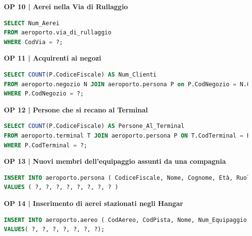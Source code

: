 
\textbf{\small OP 10 | Aerei nella Via di Rullaggio}\\

\begin{lstlisting}[language=SQL]
SELECT Num_Aerei
FROM aeroporto.via_di_rullaggio
WHERE CodVia = ?;	
\end{lstlisting}


\textbf{\small OP 11 | Acquirenti ai negozi}\\

\begin{lstlisting}[language=SQL]
SELECT COUNT(P.CodiceFiscale) AS Num_Clienti
FROM aeroporto.negozio N JOIN aeroporto.persona P on P.CodNegozio = N.CodNegozio
WHERE P.CodNegozio = ?;
\end{lstlisting}


\textbf{\small OP 12 | Persone che si recano al Terminal}\\

\begin{lstlisting}[language=SQL]
SELECT COUNT(P.CodiceFiscale) AS Persone_Al_Terminal
FROM aeroporto.terminal T JOIN aeroporto.persona P ON T.CodTerminal = P.CodTerminal
WHERE P.CodTerminal = ?;
\end{lstlisting}


\textbf{\small OP 13 | Nuovi membri dell'equipaggio assunti da una compagnia}\\

\begin{lstlisting}[language=SQL]
INSERT INTO aeroporto.persona ( CodiceFiscale, Nome, Cognome, Età, Ruolo, Ora_Inizio, Ora_fine, CodAereo )
VALUES ( ?, ?, ?, ?, ?, ?, ?, ? )	
\end{lstlisting}


\textbf{\small OP 14 | Inserimento di aerei stazionati negli Hangar}\\

\begin{lstlisting}[language=SQL]
INSERT INTO aeroporto.aereo ( CodAereo, CodPista, Nome, Num_Equipaggio, Peso, Tipologia, CodHangar)
VALUES( ?, ?, ?, ?, ?, ?, ?);	
\end{lstlisting}

